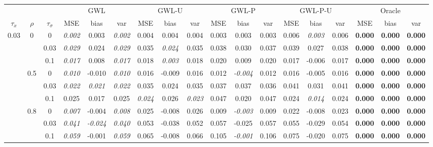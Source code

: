 \documentclass[authoryear, review, 10pt]{elsarticle}
\begin{document}
\begin{sidewaystable}[ht]
\begin{center}
\begin{tabular}{ccc|ccc|ccc|ccc|ccc|ccc}
&&&\multicolumn{3}{c}{GWL}&\multicolumn{3}{c}{GWL-U}&\multicolumn{3}{c}{GWL-P}&\multicolumn{3}{c}{GWL-P-U}&\multicolumn{3}{c}{Oracle}\\
$\tau_x$ & $\rho$ & $\tau_\sigma$ & MSE & bias & var &  MSE & bias & var &  MSE & bias & var &  MSE & bias & var &  MSE & bias & var\\ 
\hline
\multirow{9}{*}{0.03} & \multirow{3}{*}{0} & 0 & \emph{0.002} & 0.003 & \emph{0.002} & 0.004 & 0.004 & 0.004 & 0.003 & 0.003 & 0.003 & 0.006 & \emph{0.003} & 0.006 & \textbf{0.000} & \textbf{0.000} & \textbf{0.000} \\ 
 &  & 0.03 &   \emph{0.029} & 0.024 & \emph{0.029} & 0.035 & \emph{0.024} & 0.035 & 0.038 & 0.030 & 0.037 & 0.039 & 0.027 & 0.038 & \textbf{0.000} & \textbf{0.000} & \textbf{0.000} \\ 
 &  & 0.1 &   \emph{0.017} & 0.008 & \emph{0.017} & 0.018 & \emph{0.003} & 0.018 & 0.020 & 0.009 & 0.020 & 0.017 & -0.006 & 0.017 & \textbf{0.000} & \textbf{0.000} & \textbf{0.000} \\ \cline{2-18}
 & \multirow{3}{*}{0.5} & 0 &   \emph{0.010} & -0.010 & \emph{0.010} & 0.016 & -0.009 & 0.016 & 0.012 & \emph{-0.004} & 0.012 & 0.016 & -0.005 & 0.016 & \textbf{0.000} & \textbf{0.000} & \textbf{0.000} \\ 
 &  & 0.03 &   \emph{0.022} & \emph{0.021} & \emph{0.022} & 0.035 & 0.024 & 0.035 & 0.037 & 0.037 & 0.036 & 0.041 & 0.031 & 0.041 & \textbf{0.000} & \textbf{0.000} & \textbf{0.000} \\ 
 &  & 0.1 &   0.025 & 0.017 & 0.025 & \emph{0.024} & 0.026 & \emph{0.023} & 0.047 & 0.020 & 0.047 & 0.024 & \emph{0.014} & 0.024 & \textbf{0.000} & \textbf{0.000} & \textbf{0.000} \\ \cline{2-18}
 & \multirow{3}{*}{0.8} & 0 &   \emph{0.007} & -0.004 & \emph{0.008} & 0.025 & -0.008 & 0.026 & 0.009 & \emph{-0.003} & 0.009 & 0.022 & -0.008 & 0.023 & \textbf{0.000} & \textbf{0.000} & \textbf{0.000} \\ 
 &  & 0.03 &   \emph{0.041} & \emph{-0.024} & \emph{0.040} & 0.053 & -0.038 & 0.052 & 0.057 & -0.025 & 0.057 & 0.055 & -0.029 & 0.054 & \textbf{0.000} & \textbf{0.000} & \textbf{0.000} \\ 
 &  & 0.1 &   \emph{0.059} & -0.001 & \emph{0.059} & 0.065 & -0.008 & 0.066 & 0.105 & \emph{-0.001} & 0.106 & 0.075 & -0.020 & 0.075 & \textbf{0.000} & \textbf{0.000} & \textbf{0.000} \\ \cline{1-18}

\end{tabular}
\end{center}
\end{sidewaystable}
\end{document}

